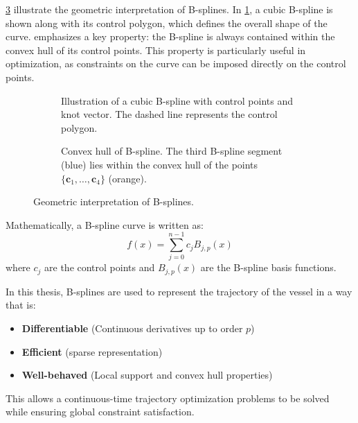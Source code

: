 \cref{fig:b-spline-geometric} illustrate the geometric interpretation of B-splines. In \cref{fig:b-spline-knots-control-points}, a cubic B-spline is shown along with its control polygon, which defines the overall shape of the curve.  emphasizes a key property: the B-spline is always contained within the convex hull of its control points. This property is particularly useful in optimization, as constraints on the curve can be imposed directly on the control points.

\begin{figure}
    \centering
    \begin{subfigure}[b]{0.45\textwidth}
        \centering
        
        \caption{Illustration of a cubic B-spline with control points and knot vector. The dashed line represents the control polygon.}
        \label{fig:b-spline-knots-control-points}
    \end{subfigure}
    \hfill
    \begin{subfigure}[b]{0.45\textwidth}
        \centering
        
        \caption{Convex hull of B-spline. The third B-spline segment (blue) lies within the convex hull of the points $\{\mathbf c_1,\ldots,\mathbf c_4\}$ (orange).}
        \label{fig:b-spline-convex-hull} 
    \end{subfigure}
    \caption{Geometric interpretation of B-splines.}
    \label{fig:b-spline-geometric}
\end{figure}

Mathematically, a B-spline curve is written as:
\[
f(x) = \sum_{j=0}^{n-1} c_j B_{j,p}(x)
\]
where \( c_j \) are the control points and \( B_{j,p}(x) \) are the B-spline basis functions.

In this thesis, B-splines are used to represent the trajectory of the vessel in a way that is:
\begin{itemize}
    \item \textbf{Differentiable} (Continuous derivatives up to order \( p \))
    \item \textbf{Efficient} (sparse representation)
    \item \textbf{Well-behaved} (Local support and convex hull properties)
\end{itemize}

This allows a continuous-time trajectory optimization problems to be solved while ensuring global constraint satisfaction. 





